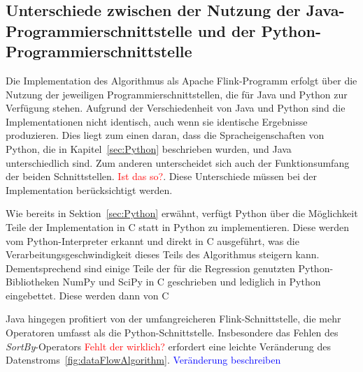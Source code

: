 \subsection{Unterschiede zwischen der Nutzung der Java-Programmierschnittstelle und der Python-Programmierschnittstelle}
\label{sec:DifferencesJavaPyFlink}
Die Implementation des Algorithmus als Apache Flink-Programm erfolgt über die Nutzung der jeweiligen Programmierschnittstellen, die für Java und Python zur Verfügung stehen. Aufgrund der Verschiedenheit von Java und Python sind die Implementationen nicht identisch, auch wenn sie identische Ergebnisse produzieren. Dies liegt zum einen daran, dass die Spracheigenschaften von Python, die in Kapitel~\ref{sec:Python} beschrieben wurden, und Java unterschiedlich sind. Zum anderen unterscheidet sich auch der Funktionsumfang der beiden Schnittstellen. \textcolor{red}{Ist das so?}. Diese Unterschiede müssen bei der Implementation berücksichtigt werden. 

Wie bereits in Sektion~\ref{sec:Python} erwähnt, verfügt Python über die Möglichkeit Teile der Implementation in C statt in Python zu implementieren. Diese werden vom Python-Interpreter erkannt und direkt in C ausgeführt, was die Verarbeitungsgeschwindigkeit dieses Teils des Algorithmus steigern kann. Dementsprechend sind einige Teile der für die Regression genutzten Python-Bibliotheken NumPy und SciPy in C geschrieben und lediglich in Python eingebettet. Diese werden dann von C

Java hingegen profitiert von der umfangreicheren Flink-Schnittstelle, die mehr Operatoren umfasst als die Python-Schnittstelle. Insbesondere das Fehlen des \textit{SortBy}-Operators \textcolor{red}{Fehlt der wirklich?} erfordert eine leichte Veränderung des Datenstroms~\ref{fig:dataFlowAlgorithm}. \textcolor{blue}{Veränderung beschreiben}


